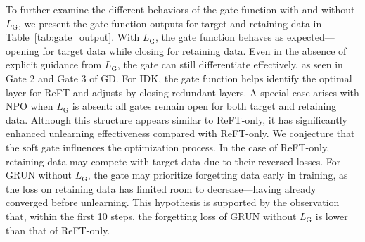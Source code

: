 To further examine the different behaviors of the gate function with and without $L_{\text{G}}$, we present the gate function outputs for target and retaining data in Table~\ref{tab:gate_output}. 
With $L_{\text{G}}$, the gate function behaves as expected—opening for target data while closing for retaining data. Even in the absence of explicit guidance from $L_{\text{G}}$, the gate can still differentiate effectively, as seen in Gate 2 and Gate 3 of GD.  
For IDK, the gate function helps identify the optimal layer for ReFT and adjusts by closing redundant layers.
A special case arises with NPO when $L_{\text{G}}$ is absent: all gates remain open for both target and retaining data. Although this structure appears similar to ReFT-only, it has significantly enhanced unlearning effectiveness compared with ReFT-only. We conjecture that the soft gate influences the optimization process. In the case of ReFT-only, retaining data may compete with target data due to their reversed losses.  
For GRUN without $L_{\text{G}}$, the gate may prioritize forgetting data early in training, as the loss on retaining data has limited room to decrease—having already converged before unlearning. This hypothesis is supported by the observation that, within the first 10 steps, the forgetting loss of GRUN without $L_{\text{G}}$ is lower than that of ReFT-only.
